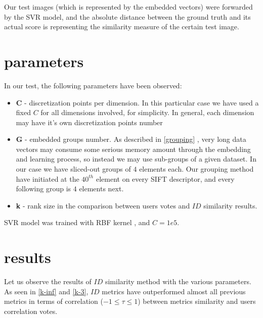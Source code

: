 Our test images (which is represented by the embedded vectors) were forwarded by the SVR model, and the absolute distance between the ground truth and its actual score is representing the similarity measure of the certain test image.

\section{parameters}

In our test, the following parameters have been observed:
\begin{itemize}
	\item \textbf{C} - discretization points per dimension. In this particular case we have used a fixed $C$ for all dimensions involved, for simplicity. In general, each dimension may have it's own discretization points number
	\item \textbf{G} - embedded groups number. As described in \ref{grouping} , very long data vectors may consume some serious memory amount through the embedding and learning process, so instead we may use sub-groups of a given dataset. In our case we have sliced-out groups of $4$ elements each. Our grouping method have initiated at the $40^{th}$ element on every SIFT descriptor, and every following group is $4$ elements next.
	\item \textbf{k} - rank size in the comparison between users votes and $ID$ similarity results.
\end{itemize}

SVR model was trained with RBF kernel \cite{rbf}, and $C = 1e5$.
\section{results}

Let us observe the results of $ID$ similarity method with the various parameters. 
As seen in \ref{k-inf} and \ref{k-3}, $ID$ metrics have outperformed almost all previous metrics in terms of correlation ($-1 \leq \tau \leq 1$) between metrics similarity and users correlation votes.


